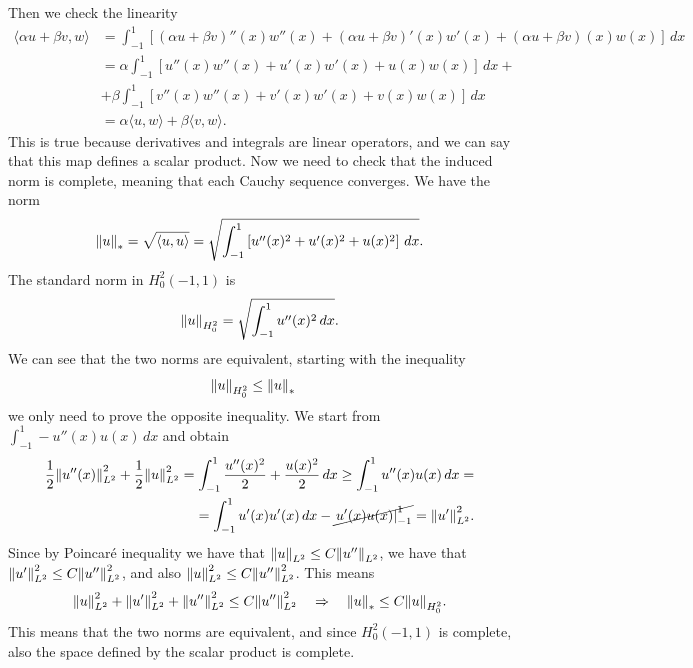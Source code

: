 \begin{enumerate}
          Then we check the linearity
          \[
              \begin{aligned}
                  \langle \alpha u + \beta v, w \rangle & = \int_{-1}^1 \left[ (\alpha u + \beta v)''(x) w''(x) + (\alpha u + \beta v)'(x) w'(x) + (\alpha u + \beta v)(x) w(x) \right] \, dx \\
                                                        & = \alpha \int_{-1}^1 \left[ u''(x) w''(x) + u'(x) w'(x) + u(x) w(x) \right] \, dx +                                                 \\
                                                        & + \beta \int_{-1}^1 \left[ v''(x) w''(x) + v'(x) w'(x) + v(x) w(x) \right] \, dx                                                    \\
                                                        & = \alpha \langle u, w \rangle + \beta \langle v, w \rangle.
              \end{aligned}
          \]
          This is true because derivatives and integrals are linear operators, and we can
          say that this map defines a scalar product. Now we need to check that the
          induced norm is complete, meaning that each Cauchy sequence converges. We have
          the norm
          \[
              \norm{u}_* = \sqrt{\langle u, u \rangle} = \sqrt{\int_{-1}^1 \left[ u''(x)^2 + u'(x)^2 + u(x)^2 \right] \, dx}.
          \]
          The standard norm in \(H^2_0(-1, 1)\) is
          \[
              \norm{u}_{H^2_0} = \sqrt{\int_{-1}^1 u''(x)^2 \, dx}.
          \]
          We can see that the two norms are equivalent, starting with the inequality
          \begin{align*}
              \norm{u}_{H^2_0} & \leq \norm{u}_*
          \end{align*}
          we only need to prove the opposite inequality. We start from \(\int_{-1}^1 -u''(x) u (x) \, dx \) and obtain
          \[
              \begin{split}
                  \frac{1}{2} \norm{u''(x)}^2_{L^2} + \frac{1}{2} \norm{u}^2_{L^2} = \int_{-1}^1 \frac{u''(x)^2}{2} + \frac{u(x)^2}{2} \, dx \geq \int_{-1}^1 u''(x) u(x) \, dx = \\= \int_{-1}^1 u'(x) u'(x) \, dx - \cancel{\left. u'(x) u(x) \right|_{-1}^1} = \norm{u'}^2_{L^2}.
              \end{split}
          \]
          Since by Poincaré inequality we have that \(\norm{u}_{L^2} \leq C
          \norm{u''}_{L^2}\), we have that \(\norm{u'}_{L^2}^2 \leq C
          \norm{u''}_{L^2}^2\), and also \(\norm{u}_{L^2}^2 \leq C \norm{u''}_{L^2}^2\).
          This means
          \[
              \norm{u}_{L^2}^2 + \norm{u'}_{L^2}^2 + \norm{u''}_{L^2}^2 \leq C \norm{u''}_{L^2}^2 \quad \Rightarrow \quad \norm{u}_* \leq C \norm{u}_{H^2_0}.
          \]
          This means that the two norms are equivalent, and since \(H^2_0(-1, 1)\) is
          complete, also the space defined by the scalar product is complete.


\end{enumerate}
